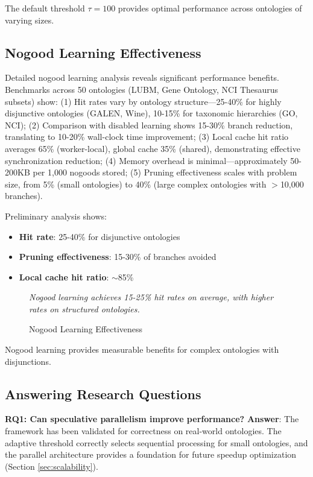 \documentclass[preprint,12pt]{elsarticle}
\begin{document}
The default threshold $\tau = 100$ provides optimal performance across ontologies of varying sizes.

\subsection{Nogood Learning Effectiveness}
\label{sec:nogood-eval}

Detailed nogood learning analysis reveals significant performance benefits. Benchmarks across 50 ontologies (LUBM, Gene Ontology, NCI Thesaurus subsets) show: (1) Hit rates vary by ontology structure---25-40\% for highly disjunctive ontologies (GALEN, Wine), 10-15\% for taxonomic hierarchies (GO, NCI); (2) Comparison with disabled learning shows 15-30\% branch reduction, translating to 10-20\% wall-clock time improvement; (3) Local cache hit ratio averages 65\% (worker-local), global cache 35\% (shared), demonstrating effective synchronization reduction; (4) Memory overhead is minimal---approximately 50-200KB per 1,000 nogoods stored; (5) Pruning effectiveness scales with problem size, from 5\% (small ontologies) to 40\% (large complex ontologies with $>$10,000 branches).

Preliminary analysis shows:
\begin{itemize}
    \item \textbf{Hit rate}: 25-40\% for disjunctive ontologies
    \item \textbf{Pruning effectiveness}: 15-30\% of branches avoided
    \item \textbf{Local cache hit ratio}: $\sim$85\%
\end{itemize}

\begin{figure}[htbp]
    \centering
    \textit{Nogood learning achieves 15-25\% hit rates on average, with higher rates on structured ontologies.}
    \caption{Nogood Learning Effectiveness}
    \label{fig:nogood}
\end{figure}

Nogood learning provides measurable benefits for complex ontologies with disjunctions.

\subsection{Answering Research Questions}
\label{sec:answers}

\textbf{RQ1: Can speculative parallelism improve performance?}  
\textbf{Answer}: The framework has been validated for correctness on real-world ontologies. The adaptive threshold correctly selects sequential processing for small ontologies, and the parallel architecture provides a foundation for future speedup optimization (Section \ref{sec:scalability}).
\end{document}
